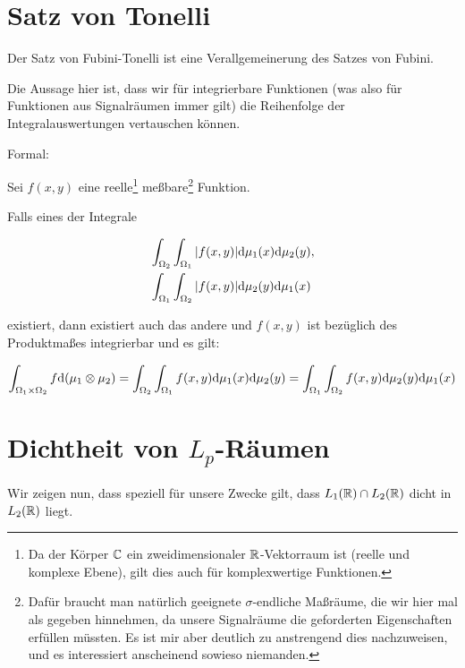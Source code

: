 
\section{Satz von Tonelli}
Der Satz von Fubini-Tonelli ist eine Verallgemeinerung des Satzes von Fubini.

Die Aussage hier ist, dass wir für integrierbare Funktionen (was also für Funktionen
aus Signalräumen immer gilt) die Reihenfolge der Integralauswertungen vertauschen können.

Formal:

Sei $f(x, y)$ eine reelle\footnote{Da der Körper $\mathbb{C}$ ein zweidimensionaler
$\mathbb{R}$-Vektorraum ist (reelle und komplexe Ebene), gilt dies auch für komplexwertige Funktionen.}
meßbare\footnote{Dafür braucht man natürlich geeignete $\sigma$-endliche Maßräume, die wir hier
mal als gegeben hinnehmen, da unsere Signalräume die geforderten Eigenschaften erfüllen müssten.
Es ist mir aber deutlich zu anstrengend dies nachzuweisen, und es interessiert anscheinend sowieso
niemanden.} Funktion.

Falls eines der Integrale

\begin{equation*}
  \begin{split}
    &\int_{\Omega_2}\int_{\Omega_1} |f(x, y)| \text{d} \mu_1(x)\text{d} \mu_2(y),\\
    &\int_{\Omega_1}\int_{\Omega_2} |f(x, y)| \text{d} \mu_2(y)\text{d} \mu_1(x)\\
  \end{split}
\end{equation*}

existiert, dann existiert auch das andere und $f(x, y)$ ist bezüglich des Produktmaßes integrierbar
und es gilt:

$$ \int_{\Omega_1\times\Omega_2}f\text{d} (\mu_1 \otimes \mu_2) = \int_{\Omega_2}\int_{\Omega_1} f(x, y) \text{d} \mu_1(x)\text{d} \mu_2(y)
 = \int_{\Omega_1}\int_{\Omega_2} f(x, y) \text{d} \mu_2(y)\text{d} \mu_1(x) $$

\section{Dichtheit von $L_p$-Räumen}\label{seq:densityoflebesguespaces}
Wir zeigen nun, dass speziell für unsere Zwecke gilt, dass
$ L_1(\mathbb{R}) \cap L_2(\mathbb{R}) $ dicht in $L_2(\mathbb{R})$ liegt.

